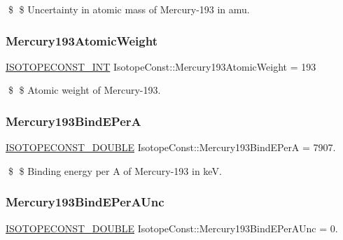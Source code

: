 \$ \$ Uncertainty in atomic mass of Mercury-\/193 in amu. \mbox{\label{group___isotope_const-_mercury-_hg193_ga5d36552f6a8df7403c928db298622009}} 
\subsubsection{\texorpdfstring{Mercury193\+Atomic\+Weight}{Mercury193AtomicWeight}}
{\footnotesize\ttfamily \mbox{\hyperlink{group___isotope_const-_macros_ga5f18360b3e99483a35c32d789e62621c}{I\+S\+O\+T\+O\+P\+E\+C\+O\+N\+S\+T\+\_\+\+I\+NT}} Isotope\+Const\+::\+Mercury193\+Atomic\+Weight = 193}

\$ \$ Atomic weight of Mercury-\/193. \mbox{\label{group___isotope_const-_mercury-_hg193_ga3b549d894a71d0ebb54bd5bf0024067c}} 
\subsubsection{\texorpdfstring{Mercury193\+Bind\+E\+PerA}{Mercury193BindEPerA}}
{\footnotesize\ttfamily \mbox{\hyperlink{group___isotope_const-_macros_ga8f45a7272ce02c0b4c65c44636ed719a}{I\+S\+O\+T\+O\+P\+E\+C\+O\+N\+S\+T\+\_\+\+D\+O\+U\+B\+LE}} Isotope\+Const\+::\+Mercury193\+Bind\+E\+PerA = 7907.}

\$ \$ Binding energy per A of Mercury-\/193 in keV. \mbox{\label{group___isotope_const-_mercury-_hg193_gaecbf9b673033e528db25a666eda61fe5}} 
\subsubsection{\texorpdfstring{Mercury193\+Bind\+E\+Per\+A\+Unc}{Mercury193BindEPerAUnc}}
{\footnotesize\ttfamily \mbox{\hyperlink{group___isotope_const-_macros_ga8f45a7272ce02c0b4c65c44636ed719a}{I\+S\+O\+T\+O\+P\+E\+C\+O\+N\+S\+T\+\_\+\+D\+O\+U\+B\+LE}} Isotope\+Const\+::\+Mercury193\+Bind\+E\+Per\+A\+Unc = 0.}

